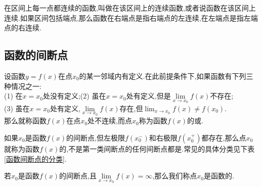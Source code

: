 
在区间上每一点都连续的函数,叫做在该区间上的连续函数,或者说函数在该区间上连续.如果区间包括端点,那么函数在右端点是指右端点的左连续,在左端点是指左端点的右连续.

\jg

\subsection{函数的间断点}
\tdefination[函数的间断点]
设函数$y=f(x)$在点$x_0$的某一邻域内有定义.在此前提条件下,如果函数有下列三种情况之一:\\[0.5em]
(1) 在$x=x_0$处没有定义;\hspace{12em}(2) 虽在$x=x_0$处有定义,但是$\displaystyle \lim\limits_{x \to x_0}f(x)$不存在;\\[0.5em]
(3) 虽在$x=x_0$处有定义,$\displaystyle \lim\limits_{x \to x_0}f(x)$存在,但$\displaystyle \lim_{x \to x_0}f(x) \ne f(x_0)$.\\[0.5em]
那么就称函数$f(x)$在点$x_0$处不连续,而点$x_0$称为函数$f(x)$的或.

如果$x_0$是函数$f(x)$的间断点,但左极限$f(x_0^-)$和右极限$f(x_0^+)$都存在,那么点$x_0$就称为函数$f(x)$的,不是第一类间断点的任何间断点都是.常见的具体分类见下表\ref{函数间断点的分类}.
\begin{table}[!htb]
	\centering
	\renewcommand{\arraystretch}{1}
	\caption{函数间断点的分类}
	\renewcommand{\arraystretch}{1}
	\label{函数间断点的分类}
\end{table} 

若$x_0$是函数$f(x)$的间断点,且$\lim\limits_{x \to x_0}f(x)=\infty $,那么我们称点$x_0$是函数的.\jg

